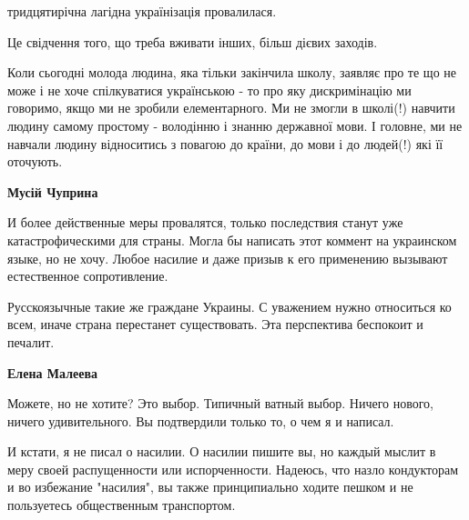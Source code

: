 \begin{itemize}
 

тридцятирічна лагідна українізація провалилася.

Це свідчення того, що треба вживати інших, більш дієвих заходів.

Коли сьогодні молода людина, яка тільки закінчила школу, заявляє про те що не
може і не хоче спілкуватися українською - то про яку дискримінацію ми говоримо,
якщо ми не зробили елементарного. Ми не змогли в школі(!) навчити людину самому
простому - володінню і знанню державної мови. І головне, ми не навчали людину
відноситись з повагою до країни, до мови і до людей(!) які її оточують.

\begin{itemize}
 
\textbf{Мусій Чуприна} 

И более действенные меры провалятся, только последствия станут уже
катастрофическими для страны. Могла бы написать этот коммент на украинском
языке, но не хочу. Любое насилие и даже призыв к его применению вызывают
естественное сопротивление.

Русскоязычные такие же граждане Украины. С уважением нужно относиться ко всем,
иначе страна перестанет существовать. Эта перспектива беспокоит и печалит.


 
\textbf{Елена Малеева} 

Можете, но не хотите? Это выбор. Типичный ватный выбор. Ничего нового, ничего
удивительного. Вы подтвердили только то, о чем я и написал.

И кстати, я не писал о насилии. О насилии пишите вы, но каждый мыслит в меру
своей распущенности или испорченности. Надеюсь, что назло кондукторам и во
избежание "насилия", вы также принципиально ходите пешком и не пользуетесь
общественным транспортом.


\end{itemize}
\end{itemize}
